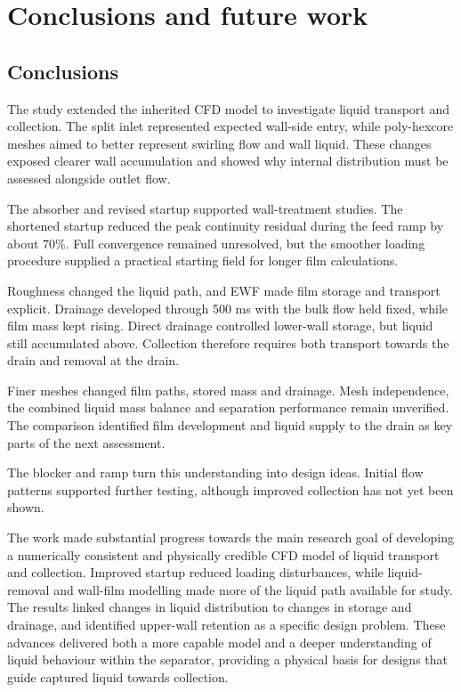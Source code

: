 \documentclass[12pt]{article}
\begin{document}
\section{Conclusions and future work}\label{conclusions-and-future-work}

\subsection{Conclusions}\label{conclusions}

The study extended the inherited CFD model to investigate liquid transport and collection. The split inlet represented expected wall-side entry, while poly-hexcore meshes aimed to better represent swirling flow and wall liquid. These changes exposed clearer wall accumulation and showed why internal distribution must be assessed alongside outlet flow.

The absorber and revised startup supported wall-treatment studies. The shortened startup reduced the peak continuity residual during the feed ramp by about 70\%. Full convergence remained unresolved, but the smoother loading procedure supplied a practical starting field for longer film calculations.

Roughness changed the liquid path, and EWF made film storage and transport explicit. Drainage developed through 500 ms with the bulk flow held fixed, while film mass kept rising. Direct drainage controlled lower-wall storage, but liquid still accumulated above. Collection therefore requires both transport towards the drain and removal at the drain.

Finer meshes changed film paths, stored mass and drainage. Mesh independence, the combined liquid mass balance and separation performance remain unverified. The comparison identified film development and liquid supply to the drain as key parts of the next assessment.

The blocker and ramp turn this understanding into design ideas. Initial flow patterns supported further testing, although improved collection has not yet been shown.

The work made substantial progress towards the main research goal of developing a numerically consistent and physically credible CFD model of liquid transport and collection. Improved startup reduced loading disturbances, while liquid-removal and wall-film modelling made more of the liquid path available for study. The results linked changes in liquid distribution to changes in storage and drainage, and identified upper-wall retention as a specific design problem. These advances delivered both a more capable model and a deeper understanding of liquid behaviour within the separator, providing a physical basis for designs that guide captured liquid towards collection.
\end{document}
